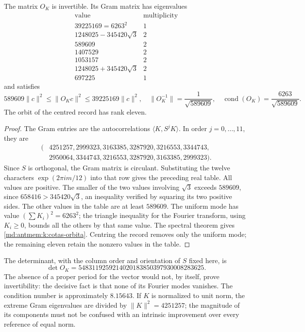 \begin{theorem}
\label{md:antmem:k:marco-ciclico}
The matrix \(O_K\) is invertible. Its Gram matrix has eigenvalues
\[
\begin{array}{c|c}
 \text{value}&\text{multiplicity}\\\hline
 39225169=6263^2&1\\
 1248025-345420\sqrt3&2\\
 589609&2\\
 1407529&2\\
 1053157&2\\
 1248025+345420\sqrt3&2\\
 697225&1
\end{array}
\]
and satisfies
\begin{equation}
 589609\|c\|^2\leq\|O_Kc\|^2\leq39225169\|c\|^2,
 \quad
 \|O_K^{-1}\|=\frac1{\sqrt{589609}},\quad
 \operatorname{cond}(O_K)=\frac{6263}{\sqrt{589609}}.
 \label{md:antmem:k:cotas-orbita}
\end{equation}
The orbit of the centred record has rank eleven.
\end{theorem}
\begin{proof}
The Gram entries are the autocorrelations
\(\langle K,S^jK\rangle\). In order \(j=0,\ldots,11\), they are
\begin{align*}
 (&4251257,2999323,3163385,3287920,3216553,3344743,\\
  &2950064,3344743,3216553,3287920,3163385,2999323).
\end{align*}
Since \(S\) is orthogonal, the Gram matrix is circulant. Substituting the twelve
characters \(\exp(2\pi i m/12)\) into that row gives the preceding
real table. All values are positive. The smaller of the two values
involving \(\sqrt3\) exceeds \(589609\), since
\(658416>345420\sqrt3\), an inequality verified by squaring
its two positive sides. The other values in the table are
at least \(589609\). The uniform mode has value
\((\sum K_i)^2=6263^2\); the triangle inequality for the Fourier
transform, using \(K_i\geq0\), bounds all the others by that same
value. The spectral theorem gives \eqref{md:antmem:k:cotas-orbita}. Centring
the record removes only the uniform mode; the remaining eleven retain
the nonzero values in the table.
\end{proof}

The determinant, with the column order and orientation of \(S\)
fixed here, is
\[
 \det O_K=5483119259214020183850397930008283625.
\]
The absence of a proper period for the vector would not, by itself, prove
invertibility: the decisive fact is that none of its Fourier modes
vanishes. The condition number is approximately \(8.15643\). If
\(K\) is normalized to unit norm, the extreme Gram eigenvalues are divided by
\(\|K\|^2=4251257\); the magnitude of its components must not
be confused with an intrinsic improvement over every reference of equal
norm.

